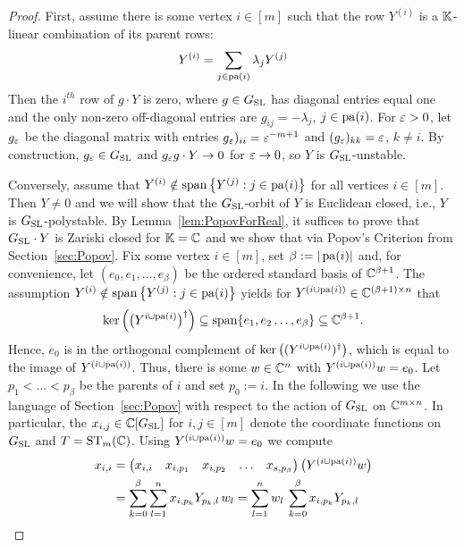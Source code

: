 \begin{proof}
	First, assume there is some vertex $i \in [m]$ such that the row $Y^{(i)}$ is a $\mathbb K$-linear combination of its parent rows:
		\[ Y^{(i)} = \sum_{j \in \operatorname{pa}(i)} \lambda_j Y^{(j)} \]
	Then the $i^{th}$ row of $g \cdot Y$ is zero, where $g \in G_{\operatorname{SL}}$ has diagonal entries equal one and the only non-zero off-diagonal entries are $g_{ij} = - \lambda_j$, $j \in \operatorname{pa}(i)$. For $\varepsilon > 0$, let $g_{\varepsilon}$ be the diagonal matrix with entries $g_{\varepsilon})_{ii} = \varepsilon^{-m+1}$ and $(g_\varepsilon)_{kk} = \varepsilon$, $k \neq i$. By construction, $g_\varepsilon \in G_{\operatorname{SL}}$ and $g_{\varepsilon} g \cdot Y \to 0$ for $\varepsilon \to 0$, so $Y$ is $G_{\operatorname{SL}}$-unstable.
	
	Conversely, assume that $ Y^{(i)} \notin \operatorname{span} \big\lbrace Y^{(j)} : j \in \operatorname{pa}(i)  \big\rbrace$ for all vertices $i \in [m]$. Then $Y \neq 0$ and we will show that the $G_{\operatorname{SL}}$-orbit of $Y$ is Euclidean closed, i.e., $Y$ is $G_{\operatorname{SL}}$-polystable. By Lemma~\ref{lem:PopovForReal}, it suffices to prove that $G_{\operatorname{SL}} \cdot Y$ is Zariski closed for $\mathbb K = \mathbb C$ and we show that via Popov's Criterion from Section~\ref{sec:Popov}. Fix some vertex $i \in [m]$, set $\beta := |\operatorname{pa}(i)|$ and, for convenience, let $(e_0,e_1,\ldots,e_\beta)$ be the ordered standard basis of $\mathbb C^{\beta +1}$. The assumption $Y^{(i)} \notin \operatorname{span} \big\lbrace Y^{(j)} : j \in \operatorname{pa}(i)  \big\rbrace$ yields for $Y^{(i \cup \operatorname{pa}(i))} \in \mathbb C^{(\beta + 1) \times n}$ that 
		\[ \ker \left( \big( Y^{i \cup \operatorname{pa}(i)} \big)^{\dagger} \right) \subseteq \operatorname{span} \{ e_1, e_2 \ldots, e_{\beta} \} \subseteq \mathbb C^{\beta + 1} .\]
	Hence, $e_0$ is in the orthogonal complement of $\ker \big( (Y^{i \cup \operatorname{pa}(i)})^{\dagger} \big)$, which is equal to the image of $Y^{(i \cup \operatorname{pa}(i))}$. Thus, there is some $w \in \mathbb C^n$ with $Y^{(i \cup \operatorname{pa}(i))} w = e_0$. Let $p_1 < \ldots < p_{\beta}$ be the parents of $i$ and set $p_0 := i$. In the following we use the language of Section~\ref{sec:Popov} with respect to the action of $G_{\operatorname{SL}}$ on $\mathbb C^{m \times n}$. In particular, the $x_{i,j} \in \mathbb C[G_{\operatorname{SL}}]$ for $i,j \in [m]$ denote the coordinate functions on $G_{\operatorname{SL}}$ and $T = \operatorname{ST}_m(\mathbb C)$.
	Using $Y^{(i \cup \operatorname{pa}(i))} w = e_0$ we compute %
		\begin{align*}
			x_{i,i} &= \begin{pmatrix} x_{i,i} & x_{i,p_1} & x_{i,p_2} & \ldots & x_{s, p_{\beta}} \end{pmatrix} \big( Y^{(i \cup \pa(i))} w \big) \\
			&= \sum_{k=0}^\beta \sum_{l=1}^n x_{i, p_k} Y_{p_k, l} \, w_l =  \sum_{l=1}^n w_l \: \sum_{k=0}^\beta x_{i,p_k} Y_{p_k, l}

\end{align*}
\end{proof}
